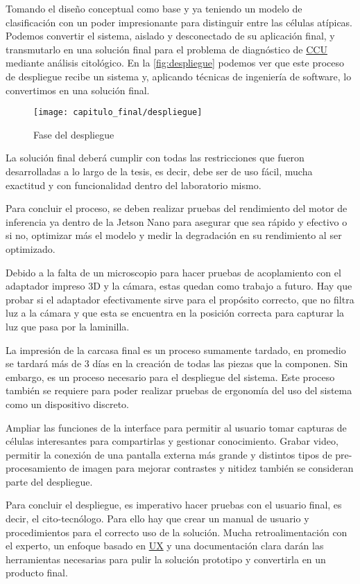 Tomando el diseño conceptual como base y ya teniendo un modelo de clasificación
con un poder impresionante para distinguir entre las células atípicas. Podemos
convertir el sistema, aislado y desconectado de su aplicación final, y
transmutarlo en una solución final para el problema de diagnóstico de
\hyperlink{abbr}{CCU} mediante análisis citológico. En la
\autoref{fig:despliegue} podemos ver que este proceso de despliegue recibe un
sistema y, aplicando técnicas de ingeniería de software, lo convertimos en una
solución final.

\begin{figure}[H]
    \centering
    \texttt{[image: capitulo\_final/despliegue]}
    \caption{Fase del despliegue}\label{fig:despliegue}
\end{figure}

La solución final deberá cumplir con todas las restricciones que fueron
desarrolladas a lo largo de la tesis, es decir, debe ser de uso fácil, mucha
exactitud y con funcionalidad dentro del laboratorio mismo.

Para concluir el proceso, se deben realizar pruebas del rendimiento del motor de
inferencia ya dentro de la Jetson Nano para asegurar que sea rápido y efectivo o
si no, optimizar más el modelo y medir la degradación en su rendimiento al ser
optimizado.

Debido a la falta de un microscopio para hacer pruebas de acoplamiento con el
adaptador impreso 3D y la cámara, estas quedan como trabajo a futuro. Hay que
probar si el adaptador efectivamente sirve para el propósito correcto, que no
filtra luz a la cámara y que esta se encuentra en la posición correcta para
capturar la luz que pasa por la laminilla.

La impresión de la carcasa final es un proceso sumamente tardado, en promedio se
tardará más de 3 días en la creación de todas las piezas que la componen. Sin
embargo, es un proceso necesario para el despliegue del sistema. Este proceso
también se requiere para poder realizar pruebas de ergonomía del uso del sistema
como un dispositivo discreto.

Ampliar las funciones de la interface para permitir al usuario tomar capturas de
células interesantes para compartirlas y gestionar conocimiento. Grabar video,
permitir la conexión de una pantalla externa más grande y distintos tipos de
pre-procesamiento de imagen para mejorar contrastes y nitidez también se
consideran parte del despliegue.

Para concluir el despliegue, es imperativo hacer pruebas con el usuario final,
es decir, el cito-tecnólogo. Para ello hay que crear un manual de usuario y
procedimientos para el correcto uso de la solución. Mucha retroalimentación con
el experto, un enfoque basado en \hyperlink{abbr}{UX} y una documentación clara
darán las herramientas necesarias para pulir la solución prototipo y convertirla
en un producto final.


